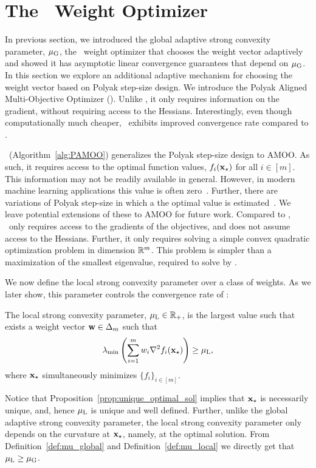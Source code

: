 \section{The \PAMOO\ Weight Optimizer}\label{sec:pamoo}

In previous section, we introduced the global adaptive strong convexity parameter, ${\mu_{\mathrm{G}}}$, the \CAMOO\ weight optimizer that chooses the weight vector adaptively and showed it has asymptotic linear convergence guarantees that depend on ${\mu_{\mathrm{G}}}$. In this section we explore an additional adaptive mechanism for choosing the weight vector based on Polyak step-size design. We introduce the Polyak Aligned Multi-Objective Optimizer (\PAMOO). Unlike \CAMOO, it only requires information on the gradient, without requiring access to the Hessians. Interestingly, even though computationally much cheaper, \PAMOO\ exhibits improved convergence rate compared to \CAMOO. 

\PAMOO\ (Algorithm~\ref{alg:PAMOO})  generalizes the Polyak step-size design to AMOO. As such, it requires access to the optimal function values,  $f_i({\mathbf{x}}_\star)$ for all $i\in [m]$. This information may not be readily available in general. However, in modern machine learning applications this value is often zero~\citep{loizou2021stochastic,wang2023generalized}. Further, there are variations of Polyak step-size in which a the optimal value is estimated~\citep{gower2021stochastic,orvieto2022dynamics}. We leave potential extensions of these to AMOO for future work. Compared to \CAMOO, \PAMOO\ only requires  access to the gradients of the objectives, and does not assume access to the Hessians. Further, it only requires solving a simple convex quadratic optimization problem in dimension $\mathbb{R}^m$. This problem is simpler than a maximization of the smallest eigenvalue, required to solve by \CAMOO. 

We now define the local strong convexity parameter over a class of weights.  As we later show, this parameter controls the convergence rate of \PAMOO:
\begin{definition} \label{def:mu_local}
     The local strong convexity parameter, ${{\mu_{\mathrm{L}}}\in \mathbb{R}_{+}}$, is the largest value such that exists a weight vector ${\mathbf{w}}\in \Delta_m$ such that  
    \begin{align}
       \lambda_{\min}\left(\sum_{i=1}^m w_i \nabla^2 f_i({\mathbf{x}}_\star) \right)\geq {\mu_{\mathrm{L}}}, \label{eq:mu_local_definition}
    \end{align}
    where ${\mathbf{x}}_\star$ simultaneously minimizes $\{f_i\}_{i\in [m]}.$
\end{definition}
Notice that Proposition~\ref{prop:unique_optimal_sol} implies that ${\mathbf{x}}_\star$ is necessarily unique, and, hence ${\mu_{\mathrm{L}}}$ is unique and well defined. Further, unlike the global adaptive strong convexity parameter, the local strong convexity parameter only depends on the curvature at ${\mathbf{x}}_\star$, namely, at the optimal solution. From Definition~\ref{def:mu_global} and Definition~\ref{def:mu_local} we directly get that ${\mu_{\mathrm{L}}}\geq {\mu_{\mathrm{G}}}$. 

